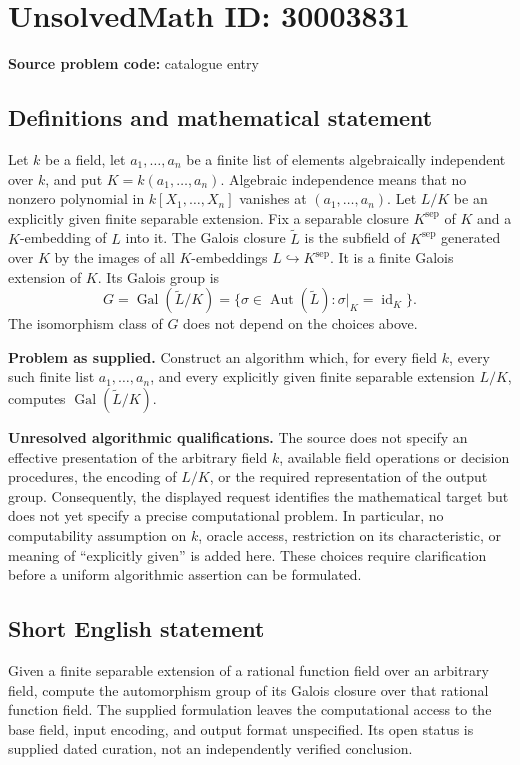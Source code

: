 \documentclass[11pt]{article}
\begin{document}
\section*{UnsolvedMath ID: 30003831}
\textbf{Source problem code:} catalogue entry
\subsection{Definitions and mathematical statement}
Let \(k\) be a field, let \(a_1,\ldots,a_n\) be a finite list of elements algebraically independent over \(k\), and put \(K=k(a_1,\ldots,a_n)\). Algebraic independence means that no nonzero polynomial in \(k[X_1,\ldots,X_n]\) vanishes at \((a_1,\ldots,a_n)\). Let \(L/K\) be an explicitly given finite separable extension. Fix a separable closure \(K^{\mathrm{sep}}\) of \(K\) and a \(K\)-embedding of \(L\) into it. The Galois closure \(\widetilde L\) is the subfield of \(K^{\mathrm{sep}}\) generated over \(K\) by the images of all \(K\)-embeddings \(L\hookrightarrow K^{\mathrm{sep}}\). It is a finite Galois extension of \(K\). Its Galois group is
\[
G=\operatorname{Gal}(\widetilde L/K)
 =\{\sigma\in\operatorname{Aut}(\widetilde L):\sigma|_K=\operatorname{id}_K\}.
\]
The isomorphism class of \(G\) does not depend on the choices above.

\textbf{Problem as supplied.} Construct an algorithm which, for every field \(k\), every such finite list \(a_1,\ldots,a_n\), and every explicitly given finite separable extension \(L/K\), computes \(\operatorname{Gal}(\widetilde L/K)\).

\textbf{Unresolved algorithmic qualifications.} The source does not specify an effective presentation of the arbitrary field \(k\), available field operations or decision procedures, the encoding of \(L/K\), or the required representation of the output group. Consequently, the displayed request identifies the mathematical target but does not yet specify a precise computational problem. In particular, no computability assumption on \(k\), oracle access, restriction on its characteristic, or meaning of ``explicitly given'' is added here. These choices require clarification before a uniform algorithmic assertion can be formulated.
\subsection{Short English statement}
Given a finite separable extension of a rational function field over an arbitrary field, compute the automorphism group of its Galois closure over that rational function field. The supplied formulation leaves the computational access to the base field, input encoding, and output format unspecified. Its open status is supplied dated curation, not an independently verified conclusion.
\end{document}
